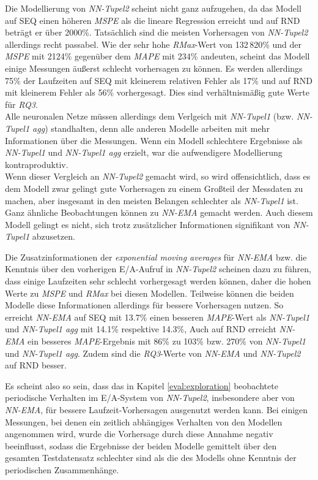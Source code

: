 \documentclass[
	twoside,
	12pt,
	a4paper,
	BCOR10mm,
	DIV14,
	listof=totoc,
	bibliography=totoc,
	headsepline
]{scrreprt}
\begin{document}
Die Modellierung von \textit{NN-Tupel2} scheint nicht ganz aufzugehen, da das Modell auf SEQ einen höheren \textit{MSPE} als die lineare Regression erreicht und auf RND beträgt er über 2000\%.
Tatsächlich sind die meisten Vorhersagen von \textit{NN-Tupel2} allerdings recht passabel.
Wie der sehr hohe \textit{RMax}-Wert von 132\,820\% und der \textit{MSPE} mit 2124\% gegenüber dem \textit{MAPE} mit 234\% andeuten, scheint das Modell einige Messungen äußerst schlecht vorhersagen zu können.
Es werden allerdings 75\% der Laufzeiten auf SEQ mit kleinerem relativen Fehler als 17\% und auf RND mit kleinerem Fehler als 56\% vorhergesagt. Dies sind verhältnismäßig gute Werte für \textit{RQ3}.\\
Alle neuronalen Netze müssen allerdings dem Verlgeich mit \textit{NN-Tupel1} (bzw. \textit{NN-Tupel1 agg}) standhalten, denn alle anderen Modelle arbeiten mit mehr Informationen über die Messungen.
Wenn ein Modell schlechtere Ergebnisse als \textit{NN-Tupel1} und \textit{NN-Tupel1 agg} erzielt, war die aufwendigere Modellierung kontraproduktiv.\\
Wenn dieser Vergleich an \textit{NN-Tupel2} gemacht wird, so wird offensichtlich, dass es dem Modell zwar gelingt gute Vorhersagen zu einem Großteil der Messdaten zu machen, aber insgesamt in den meisten Belangen schlechter als \textit{NN-Tupel1} ist.\\
Ganz ähnliche Beobachtungen können zu \textit{NN-EMA} gemacht werden.
Auch diesem Modell gelingt es nicht, sich trotz zusätzlicher Informationen signifikant von \textit{NN-Tupel1} abzusetzen.\medskip

Die Zusatzinformationen der \textit{exponential moving averages} für \textit{NN-EMA} bzw. die Kenntnis über den vorherigen E/A-Aufruf in \textit{NN-Tupel2} scheinen dazu zu führen, dass einige Laufzeiten sehr schlecht vorhergesagt werden können, daher die hohen Werte zu \textit{MSPE} und \textit{RMax} bei diesen Modellen.
Teilweise können die beiden Modelle diese Informationen allerdings für bessere Vorhersagen nutzen. So erreicht \textit{NN-EMA} auf SEQ mit 13.7\% einen besseren \textit{MAPE}-Wert als \textit{NN-Tupel1} und \textit{NN-Tupel1 agg} mit 14.1\% respektive 14.3\%, 
Auch auf RND erreicht \textit{NN-EMA} ein besseres \textit{MAPE}-Ergebnis mit 86\% zu 103\% bzw. 270\% von \textit{NN-Tupel1} und \textit{NN-Tupel1 agg}.
Zudem sind die \textit{RQ3}-Werte von \textit{NN-EMA} und \textit{NN-Tupel2} auf RND besser.\medskip

Es scheint also so sein, dass das in Kapitel \ref{eval:exploration} beobachtete periodische Verhalten im E/A-System von \textit{NN-Tupel2}, insbesondere aber von \textit{NN-EMA}, für bessere Laufzeit-Vorhersagen ausgenutzt werden kann.
Bei einigen Messungen, bei denen ein zeitlich abhängiges Verhalten von den Modellen angenommen wird, wurde die Vorhersage durch diese Annahme negativ beeinflusst, sodass die Ergebnisse der beiden Modelle gemittelt über den gesamten Testdatensatz schlechter sind als die des Modells ohne Kenntnis der periodischen Zusammenhänge.
\end{document}
